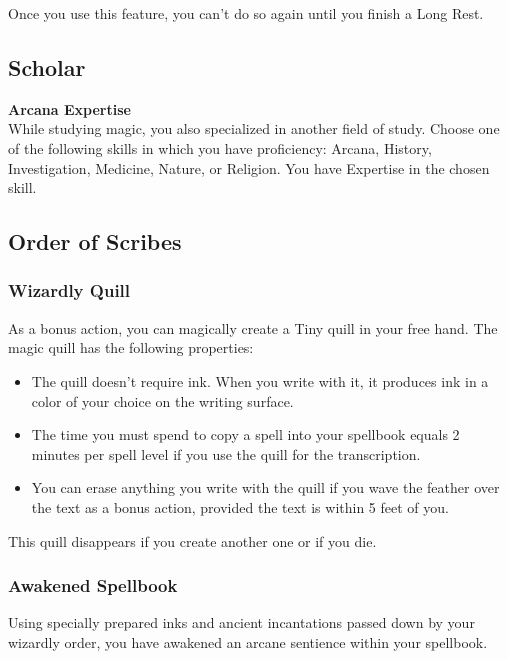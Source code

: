 \documentclass[letterpaper,openany,oneside,twocolumn]{book}
\begin{document}
Once you use this feature, you can't do so again until you finish a Long Rest.
\subsection*{Scholar}
\textbf{Arcana Expertise}\\
While studying magic, you also specialized in another field of study. Choose one of the following skills in which you have proficiency: Arcana, History, Investigation, Medicine, Nature, or Religion. You have Expertise in the chosen skill.
\subsection*{Order of Scribes}
\subsubsection*{Wizardly Quill}
As a bonus action, you can magically create a Tiny quill in your free hand. The magic quill has the following properties:
\begin{itemize}
	\item The quill doesn't require ink. When you write with it, it produces ink in a color of your choice on the writing surface.
	\item The time you must spend to copy a spell into your spellbook equals 2 minutes per spell level if you use the quill for the transcription.
	\item You can erase anything you write with the quill if you wave the feather over the text as a bonus action, provided the text is within 5 feet of you.
\end{itemize}
This quill disappears if you create another one or if you die.
\subsubsection*{Awakened Spellbook}
Using specially prepared inks and ancient incantations passed down by your wizardly order, you have awakened an arcane sentience within your spellbook.
\end{document}
